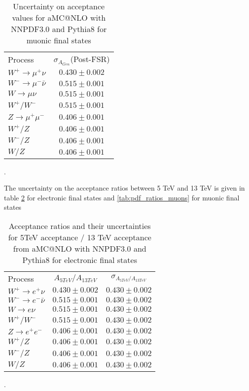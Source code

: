\documentclass[aps,prd,final,twocolumn,letterpaper]{revtex4}
\begin{document}
			\begin{table}
				\centering
				\begin{tabular}{l  c}
					Process 								& $\sigma_{A_{Gen}}$(Post-FSR) 		\\
					$W^{+}\rightarrow \mu^{+}\nu$ 			& $0.430 \pm 0.002$ 		\\
					$W^{-}\rightarrow \mu^{-}\bar{\nu}$ 	& $0.515\pm 0.001$ 			\\		
					$W\rightarrow \mu\nu$ 					& $0.515\pm 0.001$ 			\\
					$W^{+}/W^{-}$					 		& $0.515\pm 0.001$ 			\\
					$Z\rightarrow \mu^{+}\mu^{-}$ 			& $0.406\pm 0.001$ 			\\
					$W^{+}/Z$				 				& $0.406\pm 0.001$ 			\\
					$W^{-}/Z$				 				& $0.406\pm 0.001$ 			\\
					$W/Z$				 					& $0.406\pm 0.001$ 			\\					
				\end{tabular}
				\caption{Uncertainty on acceptance values for aMC@NLO with NNPDF3.0 and Pythia8 for muonic final states}.
				\label{tab:pdf_uncertainty_muons}
			\end{table}
			
			The uncertainty on the acceptance ratios between 5 TeV and 13 TeV is given in table \ref{tab:pdf_ratios_electrons} for electronic final states and \ref{tab:pdf_ratios_muons} for muonic final states 
			
			\begin{table}
				\centering
				\begin{tabular}{l c c} 
					Process 							& $A_{5TeV}/A_{13TeV}$ 		&$\sigma_{A_{5TeV}/A_{13TeV}}$	\\
					$W^{+}\rightarrow e^{+}\nu$ 		& $0.430 \pm 0.002$ 		& $0.430 \pm 0.002$ \\
					$W^{-}\rightarrow e^{-}\bar{\nu}$ 	& $0.515\pm 0.001$ 			& $0.430 \pm 0.002$ \\		
					$W\rightarrow e\nu$ 				& $0.515\pm 0.001$ 			& $0.430 \pm 0.002$ \\
					$W^{+}/W^{-}$					 	& $0.515\pm 0.001$ 			& $0.430 \pm 0.002$ \\ 
					$Z\rightarrow e^{+}e^{-}$ 			& $0.406\pm 0.001$ 			& $0.430 \pm 0.002$ \\
					$W^{+}/Z$				 			& $0.406\pm 0.001$ 			& $0.430 \pm 0.002$ \\
					$W^{-}/Z$				 			& $0.406\pm 0.001$ 			& $0.430 \pm 0.002$ \\
					$W/Z$				 				& $0.406\pm 0.001$ 			& $0.430 \pm 0.002$ \\					
				\end{tabular}
				\caption{Acceptance ratios and their uncertainties for 5TeV acceptance / 13 TeV acceptance from aMC@NLO with NNPDF3.0 and Pythia8 for electronic final states}.
				\label{tab:pdf_ratios_electrons}
			\end{table}
			
\end{document}

